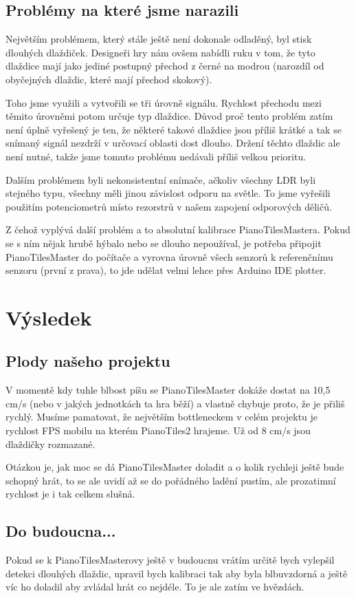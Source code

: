 \documentclass[12pt,oneside]{book} %
\begin{document}
\section{Problémy na které jsme narazili}
\qquad Největším problémem, který stále ještě není dokonale odladěný, byl stisk dlouhých dlaždiček. Designeři hry nám ovšem nabídli ruku v tom, že tyto dlaždice mají jako jediné postupný přechod z černé na modrou (narozdíl od obyčejných dlaždic, které mají přechod skokový). \par \qquad Toho jsme využili a vytvořili se tři úrovně signálu. Rychlost přechodu mezi těmito úrovněmi potom určuje typ dlaždice. Důvod proč tento problém zatím není úplně vyřešený je ten, že některé takové dlaždice jsou příliš krátké a tak se snímaný signál nezdrží v určovací oblasti dost dlouho. Držení těchto dlaždic ale není nutné, takže jsme tomuto problému nedávali příliš velkou prioritu. \par
\qquad Dalším problémem byli nekonsistentní snímače, ačkoliv všechny LDR byli stejného typu, všechny měli jinou závislost odporu na světle. To jsme vyřešili použitím potenciometrů místo rezorstrů v našem zapojení odporových děličů. \par
\qquad Z čehož vyplývá další problém a to absolutní kalibrace PianoTilesMastera. Pokud se s ním nějak hrubě hýbalo nebo se dlouho nepoužíval, je potřeba připojit PianoTilesMaster do počítače a vyrovna úrovně všech senzorů k referenčnímu senzoru (první z prava), to jde udělat velmi lehce přes Arduino IDE plotter.

\chapter{Výsledek}\label{progVys}
\section{Plody našeho projektu}
\qquad V momentě kdy tuhle blbost píšu se PianoTilesMaster dokáže dostat na 10,5 cm/s (nebo v jakých jednotkách ta hra běží) a vlastně chybuje proto, že je přiliš rychlý. Musíme pamatovat, že největším bottleneckem v celém projektu je rychlost FPS mobilu na kterém PianoTiles2 hrajeme. Už od 8 cm/s jsou dlaždičky rozmazané. \par 
\qquad Otázkou je, jak moc se dá PianoTilesMaster doladit a o kolik rychleji ještě bude schopný hrát, to se ale uvidí až se do pořádného ladění pustím, ale prozatimní rychlost je i tak celkem slušná.
\section{Do budoucna...}
\qquad Pokud se k PianoTilesMasterovy ještě v budoucnu vrátím určitě bych vylepšil detekci dlouhých dlaždic, upravil bych kalibraci tak aby byla blbuvzdorná a ještě víc ho doladil aby zvládal hrát co nejdéle. To je ale zatím ve hvězdách.
\end{document}
